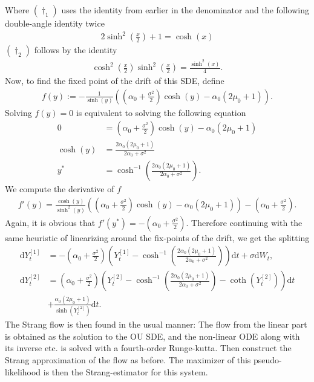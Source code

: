 Where $(\dagger_1)$ uses the identity from earlier in the denominator and the following double-angle identity twice
\begin{align*}
    2\sinh^2\left(\frac{x}{2}\right) + 1 = \cosh(x)
\end{align*}
$(\dagger_2)$ follows by the identity
\begin{align*}
    \cosh^2\left(\frac{x}{2}\right)\sinh^2\left(\frac{x}{2}\right) = \frac{\sinh^2(x)}{4}.
\end{align*}
Now, to find the fixed point of the drift of this SDE, define 
\begin{align}
    f(y) :=  -\frac{1}{\sinh(y)}\left(\left(\alpha_0 + \frac{\sigma^2}{2}\right)\cosh(y) - \alpha_0\left(2\mu_0 + 1\right)\right).
\end{align}
Solving $f(y) = 0$ is equivalent to solving the following equation
\begin{align}
    0 &= \left(\alpha_0 + \frac{\sigma^2}{2}\right)\cosh(y) - \alpha_0\left(2\mu_0 + 1\right) \nonumber \\
    \cosh(y) &= \frac{2\alpha_0\left(2\mu_0 + 1\right)}{2\alpha_0 + \sigma^2} \nonumber\\
    y^* &= \cosh^{-1}\left(\frac{2\alpha_0\left(2\mu_0 + 1\right)}{2\alpha_0 + \sigma^2}\right).
\end{align}
We compute the derivative of $f$
\begin{align}
    f'(y) = \frac{\cosh(y)}{\sinh^2(y)}\left(\left(\alpha_0 + \frac{\sigma^2}{2}\right)\cosh(y) - \alpha_0\left(2\mu_0 + 1\right)\right) - \left(\alpha_0 + \frac{\sigma^2}{2}\right).
\end{align}
Again, it is obvious that $f'(y^*) = - \left(\alpha_0 + \frac{\sigma^2}{2}\right)$.
Therefore continuing with the same heuristic of linearizing around the fix-points of the drift, we get the splitting
\begin{align}
    \mathrm{d}Y_t^{[1]} &= -\left(\alpha_0 + \frac{\sigma^2}{2}\right)\left(Y_t^{[1]} - \cosh^{-1}\left(\frac{2\alpha_0\left(2\mu_0 + 1\right)}{2\alpha_0 + \sigma^2}\right)\right)\mathrm{d}t + \sigma \mathrm{d}W_t, \\
    \mathrm{d}Y_t^{[2]} &= \left(\alpha_0 + \frac{\sigma^2}{2}\right) \left(Y_t^{[2]} - \cosh^{-1}\left(\frac{2\alpha_0\left(2\mu_0 + 1\right)}{2\alpha_0 + \sigma^2}\right) - \coth\left(Y_t^{[2]}\right) \right)\mathrm{d}t\nonumber\\
    &+ \frac{\alpha_0\left(2\mu_0 + 1\right)}{\sinh(Y_t^{[2]})}\mathrm{d}t. \label{eq:scaledFStrang}
\end{align}
The Strang flow is then found in the usual manner: The flow from the linear part is obtained as the solution to the OU SDE, and the non-linear ODE along with its inverse etc. is solved with a fourth-order Runge-kutta. Then construct the Strang approximation of the flow as before. The maximizer of this pseudo-likelihood is then the Strang-estimator for this system.  
